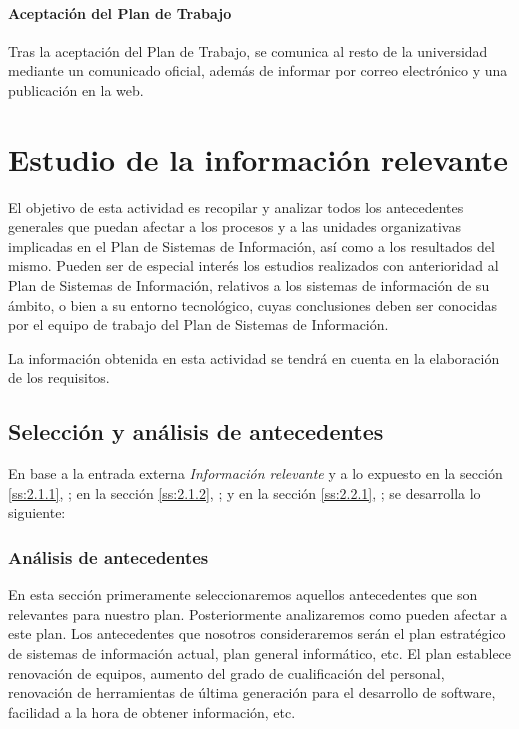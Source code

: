 \documentclass[11pt,a4paper,spanish,twoside]{report}
\begin{document}
\subsubsection{Aceptación del Plan de Trabajo}
Tras la aceptación del Plan de Trabajo, se comunica al resto de la
universidad mediante un comunicado oficial, además de informar por correo
electrónico y una publicación en la web.


\chapter{Estudio de la información relevante}
El objetivo de esta actividad es recopilar y analizar todos los antecedentes
generales que puedan afectar a los procesos y a las unidades organizativas
implicadas en el Plan de Sistemas de Información, así como a los resultados
del mismo. Pueden ser de especial interés los estudios realizados con
anterioridad al Plan de Sistemas de Información, relativos a los sistemas de
información de su ámbito, o bien a su entorno tecnológico, cuyas conclusiones
deben ser conocidas por el equipo de trabajo del Plan de Sistemas de
Información. 

La información obtenida en esta actividad se tendrá en cuenta en
la elaboración de los requisitos.

\section{Selección y análisis de antecedentes}
En base a la entrada externa \emph{Información relevante} y a lo expuesto 
en la sección \vref{ss:2.1.1}, \emph{}; 
en la sección \vref{ss:2.1.2}, \emph{}; y
en la sección \vref{ss:2.2.1}, \emph{}; 
se desarrolla lo siguiente:

\subsection{Análisis de antecedentes} \label{ss:3.1.1}
En esta sección primeramente seleccionaremos aquellos antecedentes que son
relevantes para nuestro plan. Posteriormente analizaremos como pueden
afectar a este plan. Los antecedentes que nosotros consideraremos serán el
plan estratégico de sistemas de información actual, plan general
informático, etc. 
El plan establece renovación de equipos, aumento del grado de cualificación
del personal, renovación de herramientas de última generación para el
desarrollo de software, facilidad a la hora de obtener información, etc. 
\end{document}
